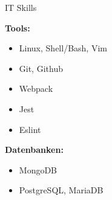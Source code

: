 \documentclass{cv}
\begin{document}
\begin{rSection}{IT Skills}
\begin{minipage}[t]{\skillWidth\linewidth}
    \medskip

    \textbf{Tools:}
    \begin{itemize}
      \item Linux, Shell/Bash, Vim
      \item Git, Github
      \item Webpack
      \item Jest
      \item Eslint
    \end{itemize}

    \textbf{Datenbanken:}
    \begin{itemize}
      \item MongoDB
      \item PostgreSQL, MariaDB
    \end{itemize}


  \end{minipage}
\end{rSection}
\end{document}
